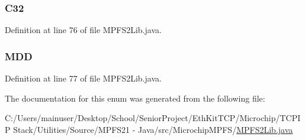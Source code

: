 \subsubsection[{C32}]{\setlength{\rightskip}{0pt plus 5cm}C32}\label{enum_microchip_m_p_f_s_1_1_m_p_f_s2_lib_1_1_m_p_f_s_output_format_a6ed5f7b9838aba43c103d45888a7dcf3}


Definition at line 76 of file M\+P\+F\+S2\+Lib.\+java.

\hypertarget{enum_microchip_m_p_f_s_1_1_m_p_f_s2_lib_1_1_m_p_f_s_output_format_a243d004bf4bcbc53e81b2d5fecfe17b8}{}
\subsubsection[{M\+D\+D}]{\setlength{\rightskip}{0pt plus 5cm}M\+D\+D}\label{enum_microchip_m_p_f_s_1_1_m_p_f_s2_lib_1_1_m_p_f_s_output_format_a243d004bf4bcbc53e81b2d5fecfe17b8}


Definition at line 77 of file M\+P\+F\+S2\+Lib.\+java.



The documentation for this enum was generated from the following file\+:\begin{DoxyCompactItemize}
\item 
C\+:/\+Users/mainuser/\+Desktop/\+School/\+Senior\+Project/\+Eth\+Kit\+T\+C\+P/\+Microchip/\+T\+C\+P\+I\+P Stack/\+Utilities/\+Source/\+M\+P\+F\+S21 -\/ Java/src/\+Microchip\+M\+P\+F\+S/\hyperlink{_m_p_f_s2_lib_8java}{M\+P\+F\+S2\+Lib.\+java}\end{DoxyCompactItemize}
